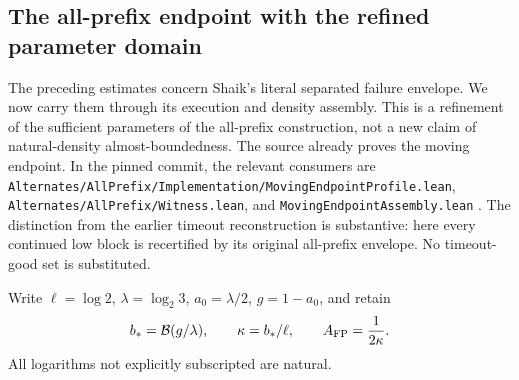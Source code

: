 \subsection{The all-prefix endpoint with the refined parameter domain}

The preceding estimates concern Shaik's literal separated failure envelope.
We now carry them through its execution and density assembly. This is a
refinement of the sufficient parameters of the all-prefix construction,
not a new claim of natural-density almost-boundedness. The source already
proves the moving endpoint. In the pinned commit, the relevant consumers
are \texttt{Alternates/AllPrefix/Implementation/MovingEndpointProfile.lean},
\texttt{Alternates/AllPrefix/Witness.lean}, and
\texttt{MovingEndpointAssembly.lean} \cite{Shaik2026v324}.
The distinction from the earlier timeout reconstruction is substantive:
here every continued low block is recertified by its original all-prefix
envelope. No timeout-good set is substituted.

Write \(\ell=\log2\), \(\lambda=\log_2 3\), \(a_0=\lambda/2\),
\(g=1-a_0\), and retain
\[
 b_*=\mathcal B(g/\lambda),\qquad \kappa=b_*/\ell,\qquad
 A_{\rm FP}=\frac1{2\kappa}.
\]
All logarithms not explicitly subscripted are natural.

